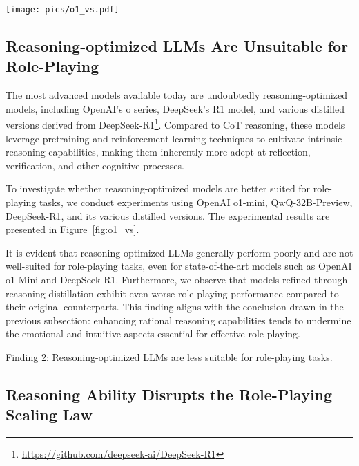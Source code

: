 \begin{figure*}[t]
    \centering
    \texttt{[image: pics/o1\_vs.pdf]}
    \caption{Experimental results of various models across 6 benchmarks. Models of similar sizes are represented using the same color scheme, with each employing different types of reasoning techniques. The vertical axis denotes the evaluation metrics specific to each dataset.}
    \label{fig:o1_vs}
\end{figure*}


\subsection{Reasoning-optimized LLMs Are Unsuitable for Role-Playing}
The most advanced models available today are undoubtedly reasoning-optimized models, including OpenAI's o series, DeepSeek's R1 model, and various distilled versions derived from DeepSeek-R1\footnote{\url{https://github.com/deepseek-ai/DeepSeek-R1}}.
Compared to CoT reasoning, these models leverage pretraining and reinforcement learning techniques to cultivate intrinsic reasoning capabilities, making them inherently more adept at reflection, verification, and other cognitive processes.

To investigate whether reasoning-optimized models are better suited for role-playing tasks, we conduct experiments using OpenAI o1-mini, QwQ-32B-Preview, DeepSeek-R1, and its various distilled versions. 
The experimental results are presented in Figure~\ref{fig:o1_vs}.

It is evident that reasoning-optimized LLMs generally perform poorly and are not well-suited for role-playing tasks, even for state-of-the-art models such as OpenAI o1-Mini and DeepSeek-R1. 
Furthermore, we observe that models refined through reasoning distillation exhibit even worse role-playing performance compared to their original counterparts. 
This finding aligns with the conclusion drawn in the previous subsection: enhancing rational reasoning capabilities tends to undermine the emotional and intuitive aspects essential for effective role-playing.

\begin{AIbox}
{Finding 2:}
Reasoning-optimized LLMs are less suitable for role-playing tasks.
\end{AIbox}




\subsection{Reasoning Ability Disrupts the Role-Playing Scaling Law}


